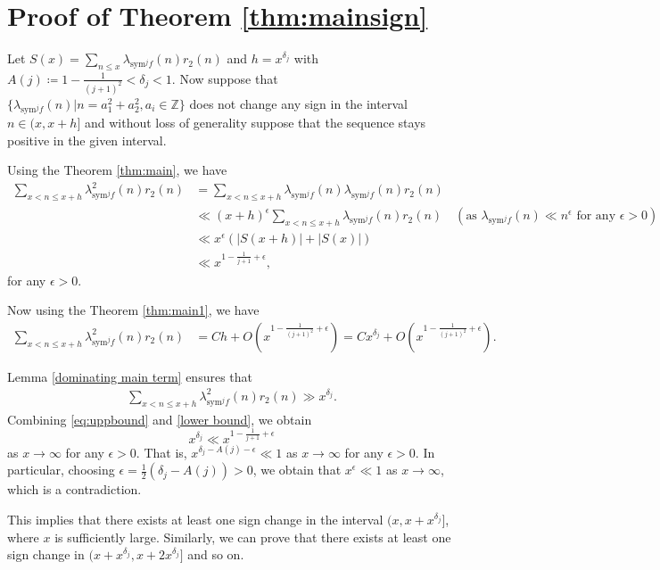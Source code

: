 \documentclass[10pt]{amsart}
\begin{document}
\section{Proof of Theorem \ref{thm:mainsign}} \label{sec:mainsign}
Let $S(x) = \sum_{n \leq x} \lambda_{\mathrm{sym}^jf}(n)r_2(n)$ and  $h=x^{\delta_j}$ with $A(j)\coloneqq 1-\frac{1}{(j+1)^2}  < \delta_j < 1$. Now suppose that $\{ \lambda_{\mathrm{sym}^jf}(n) | n = a_1^2 + a_2^2, a_i \in \mathbb{Z} \}$ does not change any sign in the interval $n \in (x,x+h]$ and without loss of generality suppose that the sequence stays positive in the given interval.

Using the Theorem \ref{thm:main}, we have
\begin{align} \label{eq:uppbound}
    \sum_{x < n \leq x+h}\lambda_{\mathrm{sym}^jf}^2(n)r_2(n) &= \sum_{x < n \leq x+h}\lambda_{\mathrm{sym}^jf}(n)\lambda_{\mathrm{sym}^jf}(n)r_2(n) \\
    & \ll (x+h)^{\epsilon} \sum_{x < n \leq x+h}\lambda_{\mathrm{sym}^jf}(n)r_2(n) \quad (\text{as } \lambda_{\mathrm{sym}^jf}(n) \ll n^\epsilon \text{ for any } \epsilon > 0) \\
    &\ll x^\epsilon (|S(x+h)|+|S(x)|) \\
    & \ll x^{1-\frac{1}{j+1}+\epsilon},
\end{align}
for any $\epsilon>0$.

Now using the Theorem \ref{thm:main1}, we have 
\begin{align}
    \sum_{x < n \leq x+h}\lambda_{\mathrm{sym}^jf}^2(n)r_2(n) & = Ch + O\left( x^{1-\frac{1}{(j+1)^2}+\epsilon}\right) 
    = Cx^{\delta_j} + O\left( x^{1-\frac{1}{(j+1)^2}+\epsilon}\right).
\end{align}

Lemma \ref{dominating main term} ensures that 
\begin{align}\label{lower bound}
    \sum_{x < n \leq x+h}\lambda_{\mathrm{sym}^jf}^2(n)r_2(n)  \gg  x^{\delta_j}.
\end{align}
Combining \eqref{eq:uppbound} and \eqref{lower bound}, we obtain
$$x^{\delta_j }\ll x^{1-\frac{1}{j+1}+\epsilon}$$
as $x\to \infty$ for any $\epsilon >0.$ That is, $x^{\delta_j -A(j)-\epsilon}\ll 1$ as $x\to \infty$ for any $\epsilon >0.$ In particular, choosing $\epsilon=\frac{1}{2}(\delta_j -A(j))>0$, we obtain that $x^{\epsilon} \ll 1$ as $x \to \infty$, which is a contradiction. 


This implies that there exists at least one sign change in the interval $(x, x+x^{\delta_j}]$, where $x$ is sufficiently large. Similarly, we can prove that there exists at least one sign change in $(x+x^{\delta_j}, x+2x^{\delta_j}]$ and so on.
\end{document}
